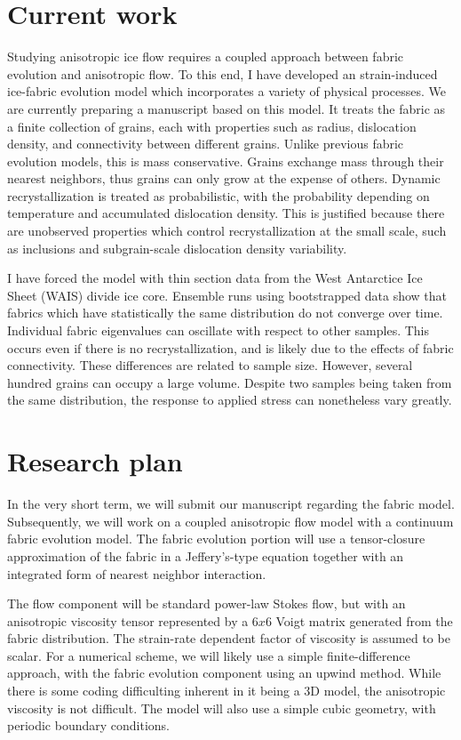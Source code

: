 \documentclass{report}
\begin{document}
\section{Current work}
Studying anisotropic ice flow requires a coupled approach between fabric evolution and anisotropic flow. To this end, I have developed an strain-induced ice-fabric evolution model which incorporates a variety of physical processes. We are currently preparing a manuscript based on this model. It treats the fabric as a finite collection of grains, each with properties such as radius, dislocation density, and connectivity between different grains. Unlike previous fabric evolution models, this is mass conservative. Grains exchange mass through their nearest neighbors, thus grains can only grow at the expense of others. Dynamic recrystallization is treated as probabilistic, with the probability depending on temperature and accumulated dislocation density. This is justified because there are unobserved properties which control recrystallization at the small scale, such as inclusions and subgrain-scale dislocation density variability.

I have forced the model with thin section data from the West Antarctice Ice Sheet (WAIS) divide ice core. Ensemble runs using bootstrapped data show that fabrics which have statistically the same distribution do not converge over time. Individual fabric eigenvalues can oscillate with respect to other samples. This occurs even if there is no recrystallization, and is likely due to the effects of fabric connectivity. These differences are related to sample size. However, several hundred grains can occupy a large volume. Despite two samples being taken from the same distribution, the response to applied stress can nonetheless vary greatly. 

\section{Research plan}
In the very short term, we will submit our manuscript regarding the fabric model. Subsequently, we will work on a coupled anisotropic flow model with a continuum fabric evolution model. The fabric evolution portion will use a tensor-closure approximation of the fabric in a Jeffery's-type equation \citep{jeffery1922} together with an integrated form of nearest neighbor interaction.

The flow component will be standard power-law Stokes flow, but with an anisotropic viscosity tensor represented by a $6x6$ Voigt matrix generated from the fabric distribution. The strain-rate dependent factor of viscosity is assumed to be scalar. For a numerical scheme, we will likely use a simple finite-difference approach, with the fabric evolution component using an upwind method. While there is some coding difficulting inherent in it being a 3D model, the anisotropic viscosity is not difficult. The model will also use a simple cubic geometry, with periodic boundary conditions.
\end{document}

